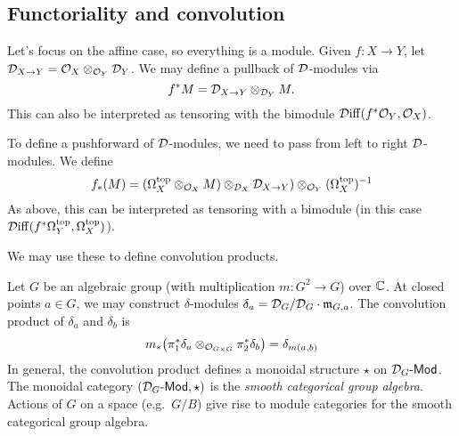 \documentclass{article}
\begin{document}
\subsection{Functoriality and convolution}

Let's focus on the affine case, so everything is a module.
Given $f: X \to Y$, let $\mathcal{D}_{X \to Y} = \mathcal{O}_X \otimes_{\mathcal{O}_Y} \mathcal{D}_Y$.
We may define a pullback of $\mathcal{D}$-modules via
\[
	f^* M = \mathcal{D}_{X \to Y} \otimes_{\mathcal{D}_Y} M.
\]
This can also be interpreted as tensoring with the bimodule $\mathcal{D}\mathrm{iff}(f^* \mathcal{O}_Y, \mathcal{O}_X)$.

To define a pushforward of $\mathcal{D}$-modules, we need to pass from left to right $\mathcal{D}$-modules.
We define
\[
	f_*(M) = (\Omega_X^{\mathrm{top}} \otimes_{\mathcal{O}_X} M) \otimes_{\mathcal{D}_X} \mathcal{D}_{X \to Y}) \otimes_{\mathcal{O}_Y} (\Omega_X^{\mathrm{top}})^{-1}
\]
As above, this can be interpreted as tensoring with a bimodule (in this case $\mathcal{D}\mathrm{iff}(f^* \Omega_Y^{\mathrm{top}}, \Omega_X^{\mathrm{top}})$).

We may use these to define convolution products.

Let $G$ be an algebraic group (with multiplication $m: G^2 \to G$) over $\mathbb{C}$.
At closed points $a \in G$, we may construct $\delta$-modules $\delta_a = \mathcal{D}_G / \mathcal{D}_G \cdot \mathfrak{m}_{G,a}$.
The convolution product of $\delta_a$ and $\delta_b$ is
\[
	m_*\big(\pi_1^* \delta_a \otimes_{\mathcal{O}_{G \times G}} \pi_2^* \delta_b\big) = \delta_{m(a,b)}
\]
In general, the convolution product defines a monoidal structure $\star$ on $\mathcal{D}_G\text{-}\mathsf{Mod}$.
The monoidal category $(\mathcal{D}_G\text{-}\mathsf{Mod}, \star)$ is the \emph{smooth categorical group algebra}.
Actions of $G$ on a space (e.g.\ $G / B$) give rise to module categories for the smooth categorical group algebra.
\end{document}
